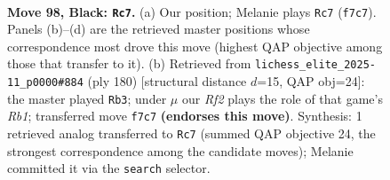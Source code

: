 \documentclass[11pt]{article}
\begin{document}
\begin{figure}[p]\centering
\begin{subfigure}{0.46\textwidth}\centering
\resizebox{\linewidth}{!}{%
\newchessgame
\chessboard[
  setfen={8/5r2/p2k4/P1p2p1p/1p3P1P/4P1P1/1PR3K1/8 b - - 8 98},
  showmover=false,
  pgfstyle=straightmove, color=movearrow, markmove={f7-c7}
]}
\caption{}
\end{subfigure}\hfill
\begin{subfigure}{0.46\textwidth}\centering
\resizebox{\linewidth}{!}{%
\newchessgame
\chessboard[
  setfen={8/1p6/p1p1rkp1/P6p/1PK2P1P/4P3/8/1R6 w - - 17 91},
  showmover=false,
  pgfstyle=straightmove, color=movearrow, markmove={b1-b3}
]}
\caption{}
\end{subfigure}
\\[4pt]

\caption{\textbf{Move 98, Black: \texttt{Rc7}.} (a) Our position; Melanie plays \texttt{Rc7} (\texttt{f7c7}). Panels (b)--(d) are the retrieved master positions whose correspondence most drove this move (highest QAP objective among those that transfer to it). (b) Retrieved from \texttt{lichess\_elite\_2025-11\_p0000\#884} (ply 180) [structural distance $d$=15, QAP obj=24]: the master played \texttt{Rb3}; under $\mu$ our \emph{Rf2} plays the role of that game's \emph{Rb1}; transferred move \texttt{f7c7} \textbf{(endorses this move)}. Synthesis: 1 retrieved analog transferred to \texttt{Rc7} (summed QAP objective 24, the strongest correspondence among the candidate moves); Melanie committed it via the \texttt{search} selector.}
\label{fig:thought-m195}
\end{figure}

\clearpage
\end{document}
